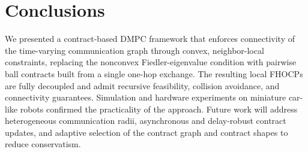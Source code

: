 \documentclass[letterpaper, 10 pt, conference]{ieeeconf}  %
\begin{document}
\section{Conclusions}\label{sec:conclusions}
We presented a contract-based DMPC framework that enforces connectivity of
the time-varying communication graph through convex, neighbor-local
constraints, replacing the nonconvex Fiedler-eigenvalue condition with
pairwise ball contracts built from a single one-hop exchange. The resulting
local FHOCPs are fully decoupled and admit recursive feasibility, collision
avoidance, and connectivity guarantees. Simulation and hardware experiments
on miniature car-like robots confirmed the practicality of the approach.
Future work will address heterogeneous communication radii, asynchronous and
delay-robust contract updates, and adaptive selection of the contract graph
and contract shapes to reduce conservatism.





\end{document}
